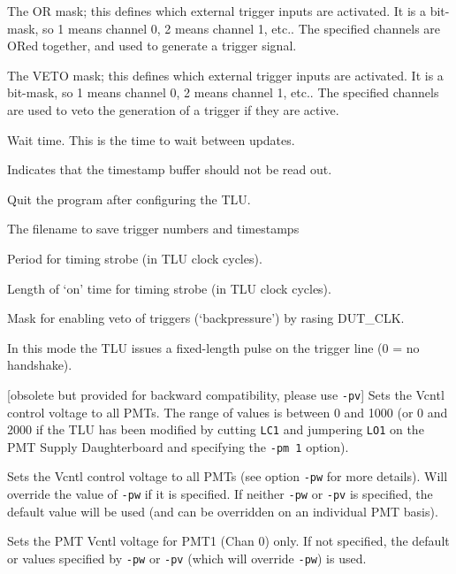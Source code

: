 \begin{description}
The OR mask; this defines which external trigger inputs are activated. It is a bit-mask, so 1
means channel 0, 2 means channel 1, etc.. The specified channels are ORed together, and used to
generate a trigger signal.

The VETO mask; this defines which external trigger inputs are activated. It is a bit-mask, so 1
means channel 0, 2 means channel 1, etc.. The specified channels are used to veto the generation
of a trigger if they are active.

Wait time. This is the time to wait between updates.

Indicates that the timestamp buffer should not be read out.

Quit the program after configuring the TLU.

     The filename to save trigger numbers and timestamps

Period for timing strobe (in \gls{TLU} clock cycles).

Length of `on' time for timing strobe (in \gls{TLU} clock cycles).

Mask for enabling veto of triggers (`backpressure') by rasing DUT\_CLK.

In this mode the TLU issues a fixed-length pulse on the trigger line (0 = no handshake).

[obsolete but provided for backward compatibility, please use \texttt{-pv}] Sets the Vcntl control
voltage to all PMTs. The range of values is between 0 and 1000 (or 0 and 2000 if the \gls{TLU} has
been modified by cutting \texttt{LC1} and jumpering \texttt{LO1} on the PMT Supply Daughterboard and
specifying the \texttt{-pm 1} option).

Sets the Vcntl control voltage to all PMTs (see option \texttt{-pw} for more details). Will override
the value of \texttt{-pw} if it is specified. If neither \texttt{-pw} or \texttt{-pv} is specified,
the default value will be used (and can be overridden on an individual PMT basis).

Sets the PMT Vcntl voltage for PMT1 (Chan 0) only. If not specified, the default or values specified
by \texttt{-pw} or \texttt{-pv} (which will override \texttt{-pw}) is used.


\end{description}
